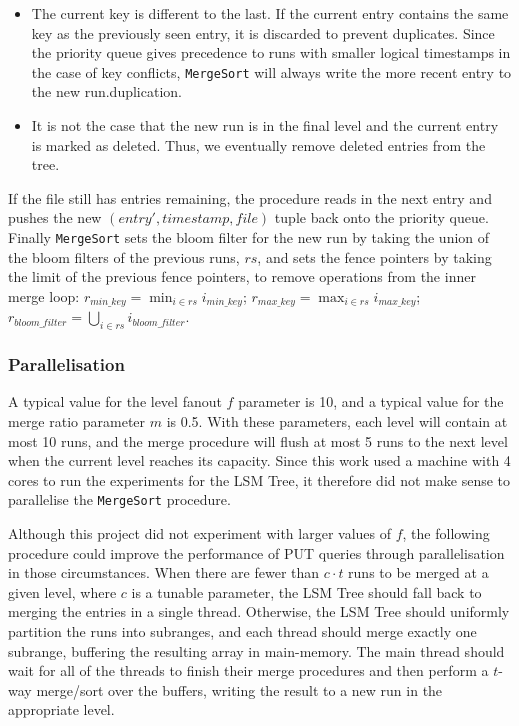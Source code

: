 \documentclass{acm}
\begin{document}
\begin{itemize}
\item The current key is different to the last. If the current entry contains the same key as the previously seen entry, it is discarded to prevent duplicates. Since the priority queue gives precedence to runs with smaller logical timestamps in the case of key conflicts, \texttt{MergeSort} will always write the more recent entry to the new run.duplication.
\item It is not the case that the new run is in the final level and the current entry is marked as deleted. Thus, we eventually remove deleted entries from the tree.
\end{itemize}

If the file still has entries remaining, the procedure reads in the next entry and pushes the new $(entry', timestamp, file)$ tuple back onto the priority queue. Finally \texttt{MergeSort} sets the bloom filter for the new run by taking the union of the bloom filters of the previous runs, $rs$, and sets the fence pointers by taking the limit of the previous fence pointers, to remove operations from the inner merge loop: $r_{min\_key} = \min_{i \in rs} i_{min\_key}$; $r_{max\_key} = \max_{i \in rs} i_{max\_key}$; $r_{bloom\_filter} = \bigcup_{i \in rs} i_{bloom\_filter}$.

\subsubsection{Parallelisation}

A typical value for the level fanout $f$ parameter is 10, and a typical value for the merge ratio parameter $m$ is 0.5. With these parameters, each level will contain at most 10 runs, and the merge procedure will flush at most 5 runs to the next level when the current level reaches its capacity. Since this work used a machine with 4 cores to run the experiments for the LSM Tree, it therefore did not make sense to parallelise the \texttt{MergeSort} procedure.

Although this project did not experiment with larger values of $f$, the following procedure could improve the performance of PUT queries through parallelisation in those circumstances. When there are fewer than $c\cdot t$ runs to be merged at a given level, where $c$ is a tunable parameter, the LSM Tree should fall back to merging the entries in a single thread. Otherwise, the LSM Tree should uniformly partition the runs into subranges, and each thread should merge exactly one subrange, buffering the resulting array in main-memory. The main thread should wait for all of the threads to finish their merge procedures and then perform a $t$-way merge/sort over the buffers, writing the result to a new run in the appropriate level.
\end{document}
